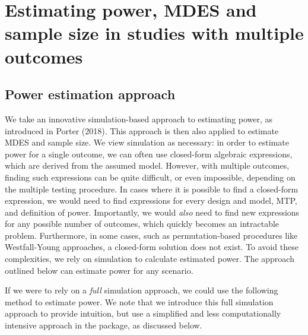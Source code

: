 \documentclass[
]{article}
\begin{document}
\section{Estimating power, MDES and sample size in studies with multiple outcomes}
\label{sec:est}

\subsection{Power estimation approach}
\label{sec:est_power}

We take an innovative simulation-based approach to estimating power, as
introduced in Porter (2018). This approach is then also applied to
estimate MDES and sample size. We view simulation as necessary: in order
to estimate power for a single outcome, we can often use closed-form
algebraic expressions, which are derived from the assumed model.
However, with multiple outcomes, finding such expressions can be quite
difficult, or even impossible, depending on the multiple testing
procedure. In cases where it is possible to find a closed-form
expression, we would need to find expressions for every design and
model, MTP, and definition of power. Importantly, we would \emph{also}
need to find new expressions for any possible number of outcomes, which
quickly becomes an intractable problem. Furthermore, in some cases, such
as permutation-based procedures like Westfall-Young approaches, a
closed-form solution does not exist. To avoid these complexities, we
rely on simulation to calculate estimated power. The approach outlined
below can estimate power for any scenario.

If we were to rely on a \emph{full} simulation approach, we could use
the following method to estimate power. We note that we introduce this
full simulation approach to provide intuition, but use a simplified and
less computationally intensive approach in the package, as discussed
below.
\end{document}

